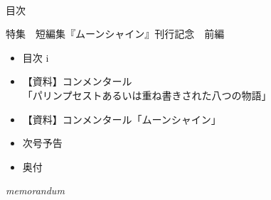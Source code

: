 \documentclass[10pt, a5paper, twoside]{jsarticle}
\theoremstyle{definition}
\begin{document}
	\begin{center}

	~ %

		\Large{目次}

		\vspace{5mm}

		\normalsize{特集　短編集『ムーンシャイン』刊行記念　前編}

	\end{center}

	\begin{itemize}

		\item 目次 \dotfill i

			\vspace{3mm}

		\item 【資料】コンメンタール \\ \hfill「パリンプセストあるいは重ね書きされた八つの物語」 

			\vspace{3mm}

		\item 【資料】コンメンタール「ムーンシャイン」 

			\vspace{3mm}

		\item 次号予告 

			\vspace{3mm}

		\item 奥付 

	\end{itemize}

	\vfill


	\newpage

	\begin{center}

		\Large{\textit{memorandum}}

	\end{center}
\end{document}
